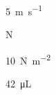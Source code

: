 \documentclass{article}
\begin{document}
\SI{5}{\meter\per\second}

\si{\newton}

\SI{10}{\newton\per\meter\squared}

\SI{42}{\micro\liter}
\end{document}
